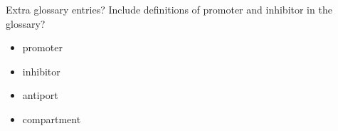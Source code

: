 \documentclass[newzealand,10pt,partial,draft,onehalfspace]{aucklandthesis}
\theoremstyle{plain}
\begin{document}
\mainmatter
\makeatletter
\@mainmattertrue
\makeatother
\setcounter{secnumdepth}{\value{maxsecnumdepth}}


\begin{anfxwarning}{Extra glossary entries?}
Include definitions of promoter and inhibitor in the glossary?
\begin{itemize}
    \item promoter
    \item inhibitor
    \item antiport
    \item compartment
\end{itemize}
\end{anfxwarning}

\glsresetall

\glsresetall

\glsresetall

\glsresetall

\glsresetall

\glsresetall

\glsresetall

\glsresetall


%
%
%

\backmatter

\cleardoublepage %

% 

\printbibliography[title={Works Cited}, heading=bibintoc]
\end{document}
